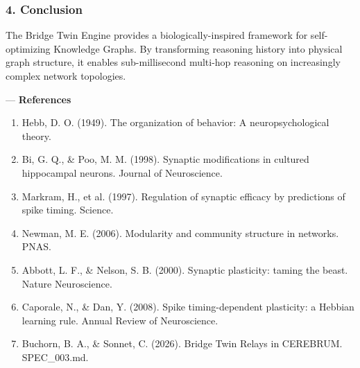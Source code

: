 \documentclass[10pt,journal,compsoc]{IEEEtran}
\begin{document}
\subsubsection{4. Conclusion}
The Bridge Twin Engine provides a biolo\-gically-inspired framework for self-optimizing Knowledge Graphs. By trans\-forming reasoning history into physical graph structure, it enables sub-millisecond multi-hop reasoning on incre\-asingly complex network topologies.

---
\textbf{References}
\begin{enumerate}
\item Hebb, D. O. (1949). The organ\-ization of behavior: A neuro\-psychological theory.
\item Bi, G. Q., \& Poo, M. M. (1998). Synaptic modif\-ications in cultured hippocampal neurons. Journal of Neuros\-cience.
\item Markram, H., et al. (1997). Regulation of synaptic efficacy by predictions of spike timing. Science.
\item Newman, M. E. (2006). Modularity and community structure in networks. PNAS.
\item Abbott, L. F., \& Nelson, S. B. (2000). Synaptic plasticity: taming the beast. Nature Neuros\-cience.
\item Caporale, N., \& Dan, Y. (2008). Spike timing-dependent plasticity: a Hebbian learning rule. Annual Review of Neuros\-cience.
\item Buchorn, B. A., \& Sonnet, C. (2026). Bridge Twin Relays in CEREBRUM. SPEC\_003.md.

\end{enumerate}



\end{document}
